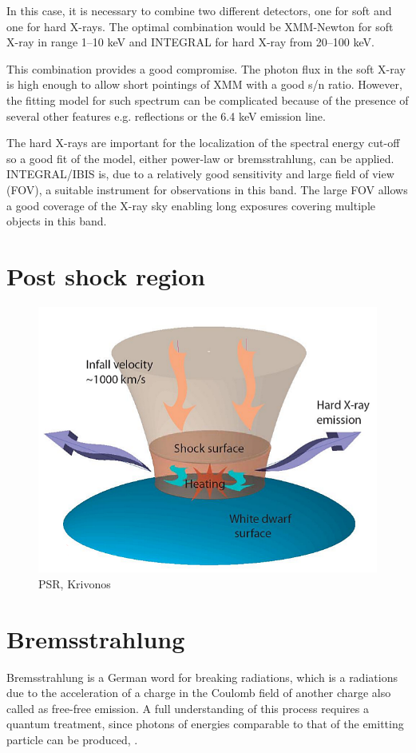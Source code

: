 \documentclass[oneside,a4paper,11pt]{report}
\begin{document}
In this case, it is necessary to combine two different detectors, one for soft and one 
for hard X-rays. The optimal combination would be XMM-Newton for soft X-ray in range 1–10 keV 
and INTEGRAL for hard X-ray from 20–100 keV. 

This combination provides a good compromise. The photon flux in the soft X-ray is high enough 
to allow short pointings of XMM with a good s/n ratio. However, the fitting model for such spectrum 
can be complicated because of the presence of several other features e.g. reflections or the 6.4 keV 
emission line.

The hard X-rays are important for the localization of the spectral energy cut-off so a good fit 
of the model, either power-law or bremsstrahlung, can be applied. INTEGRAL/IBIS is, 
due to a relatively good sensitivity and large field of view (FOV), a suitable instrument 
for observations in this band. The large FOV allows a good coverage 
of the X-ray sky enabling long exposures covering multiple objects in this band.  

\section{Post shock region}

\begin{figure}[hbt]
\centering
\includegraphics[totalheight=5cm]{plot/psr}
\caption{PSR, Krivonos }
\label{psr1} 
\end{figure}



\section{Bremsstrahlung}
Bremsstrahlung is a German word for breaking radiations, which is a radiations due to the acceleration 
of a charge in the Coulomb field of another charge also called as free-free emission. A full 
understanding of this process requires a quantum treatment, since photons of energies comparable 
to that of the emitting particle can be produced, \citet{rybicki:1}.
\end{document}
